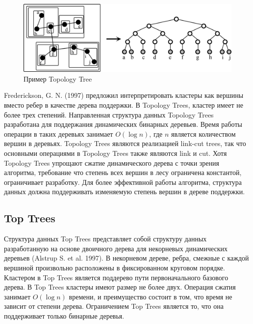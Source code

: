 \documentclass[specification,annotation]{itmo-student-thesis}
\begin{document}
\begin{figure}[!ht]
\centering
\includegraphics[width=\textwidth]{pic/topology-tree.png}
\caption{Пример Topology Tree}\label{fig:topology-tree}
\end{figure}

Frederickson, G. N. (1997) предложил интерпретировать кластеры как вершины вместо ребер в качестве дерева поддержки. В Topology Trees, кластер имеет не более 
трех степений. Направленная структура данных Topology Trees разработана для поддержания динамических бинарных деревьев. Время работы операции в таких 
деревьях занимает $O(\log n)$, где $n$ является количеством вершин в деревьях. Topology Trees 
являются реализацией link-cut trees, так что основными операциями в 
Topology Trees также являются link и cut. Хотя Topology Trees упрощают сжатие динамического дерева с точки зрения алгоритма, требование что степень всех вершин 
в лесу ограничена константой, ограничивает разработку. Для более эффективной работы алгоритма, структура данных должна поддерживать изменяемую 
степень вершин в дереве поддержки.

\subsection{Top Trees}

Структура данных Top Trees представляет собой структуру данных разработанную на основе двоичного дерева для некорневых динамических деревьев (Alstrup S. et 
al. 1997). В некорневом дереве, ребра, смежные с каждой вершиной произвольно расположены в фиксированном круговом порядке. Кластером в Top Trees является 
поддерево пути первоначального базового дерева. В Top Trees кластеры имеют размер не более двух. 
Операция сжатия занимает $O(\log n)$ времени, и преимущество 
состоит в том, что время не зависит от степени дерева. Ограничением Top Trees является то, что она поддерживает только бинарные деревья.
\end{document}
